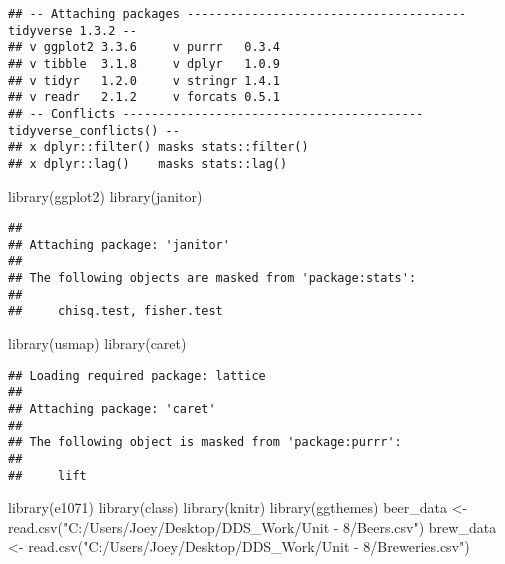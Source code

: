 \documentclass[
]{article}
\newenvironment{Shaded}{\begin{snugshade}}{\end{snugshade}}
\newcommand{\FunctionTok}[1]{\textcolor[rgb]{0.00,0.00,0.00}{#1}}
\newcommand{\NormalTok}[1]{#1}
\newcommand{\OtherTok}[1]{\textcolor[rgb]{0.56,0.35,0.01}{#1}}
\newcommand{\StringTok}[1]{\textcolor[rgb]{0.31,0.60,0.02}{#1}}
\begin{document}
\begin{verbatim}
## -- Attaching packages --------------------------------------- tidyverse 1.3.2 --
## v ggplot2 3.3.6     v purrr   0.3.4
## v tibble  3.1.8     v dplyr   1.0.9
## v tidyr   1.2.0     v stringr 1.4.1
## v readr   2.1.2     v forcats 0.5.1
## -- Conflicts ------------------------------------------ tidyverse_conflicts() --
## x dplyr::filter() masks stats::filter()
## x dplyr::lag()    masks stats::lag()
\end{verbatim}

\begin{Shaded}
\begin{Highlighting}[]
\FunctionTok{library}\NormalTok{(ggplot2)}
\FunctionTok{library}\NormalTok{(janitor)}
\end{Highlighting}
\end{Shaded}

\begin{verbatim}
## 
## Attaching package: 'janitor'
## 
## The following objects are masked from 'package:stats':
## 
##     chisq.test, fisher.test
\end{verbatim}

\begin{Shaded}
\begin{Highlighting}[]
\FunctionTok{library}\NormalTok{(usmap)}
\FunctionTok{library}\NormalTok{(caret)}
\end{Highlighting}
\end{Shaded}

\begin{verbatim}
## Loading required package: lattice
## 
## Attaching package: 'caret'
## 
## The following object is masked from 'package:purrr':
## 
##     lift
\end{verbatim}

\begin{Shaded}
\begin{Highlighting}[]
\FunctionTok{library}\NormalTok{(e1071)}
\FunctionTok{library}\NormalTok{(class)}
\FunctionTok{library}\NormalTok{(knitr)}
\FunctionTok{library}\NormalTok{(ggthemes)}
\NormalTok{beer\_data }\OtherTok{\textless{}{-}}\FunctionTok{read.csv}\NormalTok{(}\StringTok{"C:/Users/Joey/Desktop/DDS\_Work/Unit {-} 8/Beers.csv"}\NormalTok{)}
\NormalTok{brew\_data }\OtherTok{\textless{}{-}} \FunctionTok{read.csv}\NormalTok{(}\StringTok{"C:/Users/Joey/Desktop/DDS\_Work/Unit {-} 8/Breweries.csv"}\NormalTok{)}
\end{Highlighting}
\end{Shaded}
\end{document}
